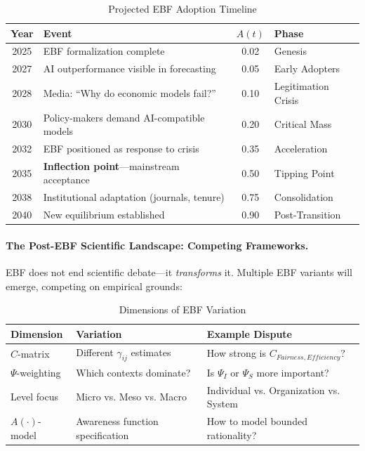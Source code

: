 \begin{table}[htbp]
\centering
\caption{Projected EBF Adoption Timeline}
\label{tab:ebf-timeline}
\renewcommand{\arraystretch}{1.3}
\small
\begin{tabular}{@{}clcl@{}}
\toprule
\textbf{Year} & \textbf{Event} & $A(t)$ & \textbf{Phase} \\
\midrule
2025 & EBF formalization complete & 0.02 & Genesis \\
2027 & AI outperformance visible in forecasting & 0.05 & Early Adopters \\
2028 & Media: ``Why do economic models fail?'' & 0.10 & Legitimation Crisis \\
2030 & Policy-makers demand AI-compatible models & 0.20 & Critical Mass \\
2032 & EBF positioned as response to crisis & 0.35 & Acceleration \\
2035 & \textbf{Inflection point}---mainstream acceptance & 0.50 & Tipping Point \\
2038 & Institutional adaptation (journals, tenure) & 0.75 & Consolidation \\
2040 & New equilibrium established & 0.90 & Post-Transition \\
\bottomrule
\end{tabular}
\end{table}

\paragraph{The Post-EBF Scientific Landscape: Competing Frameworks.}

EBF does not end scientific debate---it \textit{transforms} it. Multiple EBF variants
will emerge, competing on empirical grounds:

\begin{table}[htbp]
\centering
\caption{Dimensions of EBF Variation}
\label{tab:ebf-variants}
\renewcommand{\arraystretch}{1.3}
\small
\begin{tabular}{@{}lll@{}}
\toprule
\textbf{Dimension} & \textbf{Variation} & \textbf{Example Dispute} \\
\midrule
$C$-matrix & Different $\gamma_{ij}$ estimates & How strong is $C_{Fairness,Efficiency}$? \\
$\Psi$-weighting & Which contexts dominate? & Is $\Psi_I$ or $\Psi_S$ more important? \\
Level focus & Micro vs. Meso vs. Macro & Individual vs. Organization vs. System \\
$A(\cdot)$-model & Awareness function specification & How to model bounded rationality? \\
\bottomrule
\end{tabular}
\end{table}

